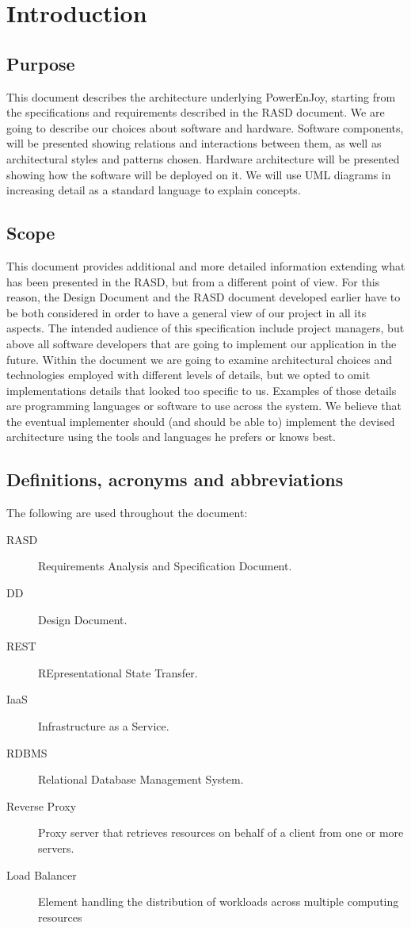 \section{Introduction}

\subsection{Purpose}
This document describes the architecture underlying PowerEnJoy,
starting from the specifications and requirements described in the RASD document.
We are going to describe our choices about software and hardware.
Software components, will be presented showing relations and interactions between them,
as well as architectural styles and patterns chosen. Hardware architecture will be presented
showing how the software will be deployed on it.
We will use UML diagrams in increasing detail as a standard language to explain concepts.
 
\subsection{Scope}
This document provides additional and more detailed information extending what has been presented in the RASD,
but from a different point of view. For this reason, the Design Document and the RASD 
document developed earlier have to be both considered in order to have a general view of our project 
in all its aspects. 
The intended audience of this specification include project managers, but above all software developers 
that are going to implement our application in the future. 
Within the document we are going to examine architectural choices and technologies employed
with different levels of details, but we opted to omit implementations details that looked 
too specific to us. Examples of those details are programming languages or
software to use across the system.
We believe that the eventual implementer should (and should be able to) implement the devised
architecture using the tools and languages he prefers or knows best.
 
\subsection{Definitions, acronyms and abbreviations}
The following are used throughout the document:
\begin{description}
\item[RASD] Requirements Analysis and Specification Document.
\item[DD] Design Document.
\item[REST] REpresentational State Transfer.
\item[IaaS] Infrastructure as a Service.
\item[RDBMS] Relational Database Management System.
\item[Reverse Proxy] Proxy server that retrieves resources on behalf of a client
    from one or more servers.
\item[Load Balancer] Element handling the distribution of workloads across
    multiple computing resources
\end{description}
